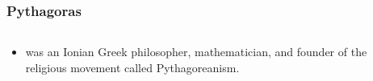 \begin{module}[id=pythagoras]
\begin{frame}
  \frametitle{Pythagoras}
  \begin{columns}
    \begin{column}{5.8cm}
      \begin{itemize}
      \item
      \begin{definition}
         was an Ionian Greek philosopher, mathematician, and founder of the religious movement called Pythagoreanism.
      \end{definition}
    \end{itemize}
    \end{column}
    \begin{column}{5.5cm}
    \end{column}
  \end{columns}
\end{frame}
\end{module}
